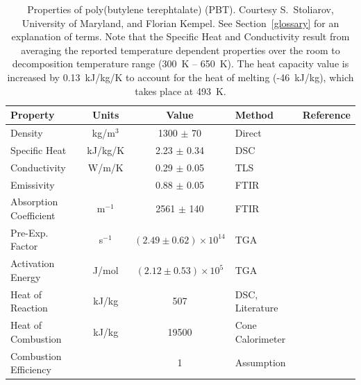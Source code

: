 \begin{table}[h!]
\caption[Properties of poly(butylene terephtalate) (PBT).]{Properties of poly(butylene terephtalate) (PBT). Courtesy S.~Stoliarov, University of Maryland, and
Florian Kempel.
See Section~\ref{glossary} for an explanation of terms. Note that the Specific Heat and Conductivity result from averaging the reported temperature dependent
properties over the room to decomposition temperature range (300~K -- 650~K).
The heat capacity value is increased by 0.13~kJ/kg/K to account for the heat of melting (-46~kJ/kg), which takes place at 493~K.}
\begin{center}
\begin{tabular}{|l|c|c|l|l|}
\hline
Property                & Units     & Value                             & Method                                & Reference                     \\ \hline \hline
Density                 & kg/m$^3$  & 1300 $\pm$ 70                     & Direct                                & \cite{Kempel:1}               \\ \hline
Specific Heat           & kJ/kg/K   & 2.23 $\pm$ 0.34                   & DSC                                   & \cite{Kempel:1}               \\ \hline
Conductivity            & W/m/K     & 0.29 $\pm$ 0.05                   & TLS                                   & \cite{Kempel:1}               \\ \hline
Emissivity              &           & 0.88 $\pm$ 0.05                   & FTIR                                  & \cite{Linteris:2}             \\ \hline
Absorption Coefficient  & m$^{-1}$  & 2561 $\pm$ 140                    & FTIR                                  & \cite{Linteris:2}             \\ \hline
Pre-Exp. Factor         & s$^{-1}$  & $(2.49 \pm 0.62) \times 10^{14}$  & TGA                                   & \cite{Kempel:1}               \\ \hline
Activation Energy       & J/mol   & $(2.12 \pm 0.53) \times 10^{5}$   & TGA                                   & \cite{Kempel:1}               \\ \hline
Heat of Reaction        & kJ/kg     & 507                               & DSC, Literature                       & \cite{Kempel:1,Lyon:Ency2005} \\ \hline
Heat of Combustion      & kJ/kg     & 19500                             & Cone Calorimeter                      & \cite{Kempel:1}               \\ \hline
Combustion Efficiency   &           & 1                                 & Assumption                            & \cite{Kempel:1}               \\ \hline
\end{tabular}
\end{center}
\label{Properties_PBT}
\end{table}


